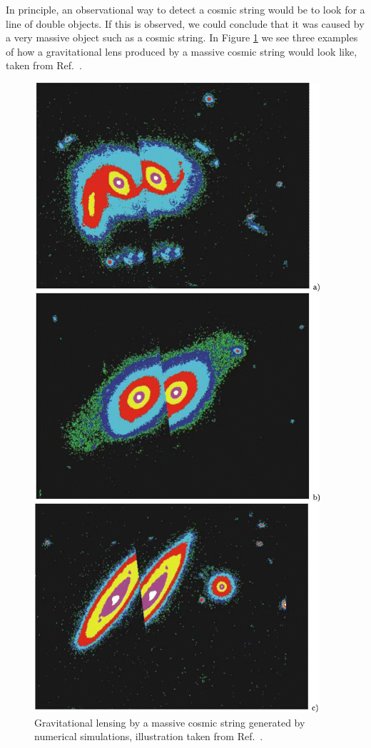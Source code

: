  In principle,  an observational way to detect a cosmic string would be to look for a line of double objects. If this is observed, we could conclude that it was caused by a very massive object such as a cosmic string. In Figure \ref{fig:numlens} we see three examples of how a gravitational lens produced by a massive cosmic string would look like, taken from Ref.\ \cite{stringlens}.

\begin{figure}
	\centering
	\includegraphics[scale=0.5]{./figures/stringlensing.jpeg}
	\caption{Gravitational lensing by a massive cosmic string generated by numerical simulations, illustration taken from Ref.\ \cite{stringlens}.}
	\label{fig:numlens}
\end{figure} 

